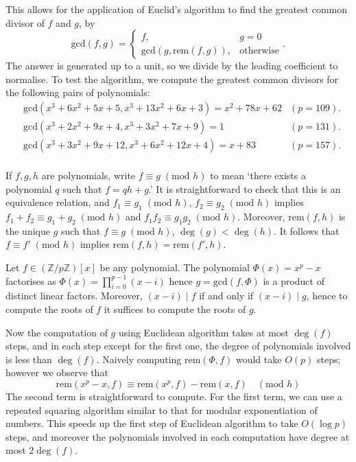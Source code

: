 \documentclass[12pt]{article}
\newcommand{\textmod}[1]{\;(\text{mod }#1)}
\newcommand{\mathmod}[1]{\quad(\text{mod }#1)}
\begin{document}
This allows for the application of Euclid's algorithm to find the greatest
common divisor of \(f\) and \(g\), by 
\[\text{gcd}(f,g) = \begin{cases} f, &g=0 \\
\text{gcd}(g,\text{rem}(f,g)),&\text{otherwise}\end{cases}.\]
The answer is generated up to a unit, so we divide by the leading coefficient to
normalise. To test the algorithm, we compute the greatest common divisors for
the following pairs of polynomials: 
\begin{align*}
    &\text{gcd}(x^3+6x^2+5x+5, x^3+13x^2+6x+3) = x^2 + 78x + 62 &(p=109). \\
    &\text{gcd}(x^3+2x^2+9x+4, x^3+3x^2+7x+9) = 1 &(p=131). \\
    &\text{gcd}(x^3+3x^2+9x+12, x^3+6x^2+12x+4) = x+83 &(p=157). \\
\end{align*}

If \(f,g,h\) are polynomials, write \(f\equiv g\textmod{h}\) to mean `there
exists a polynomial \(q\) such that \(f = qh+g\).' It is straightforward to
check that this is an equivalence relation, and \(f_1\equiv g_1\textmod{h}\),
\(f_2\equiv g_2\textmod{h}\) implies \(f_1+f_2 \equiv g_1+g_2\textmod{h}\) and
\(f_1f_2\equiv g_1g_2\textmod{h}\).  Moreover, \(\text{rem}(f,h)\) is the unique
\(g\) such that \(f\equiv g\textmod{h}\), \(\deg(g)<\deg(h)\). It follows that
\(f\equiv f'\textmod{h}\) implies \(\text{rem}(f,h)=\text{rem}(f',h)\).

Let \(f \in (\mathbb{Z}/p\mathbb{Z})[x]\) be any polynomial. The polynomial
\(\Phi(x)=x^p-x \) factorises as \(\Phi(x) = \prod_{i=0}^{p-1}(x-i)\) hence
\(g=\text{gcd}(f,\Phi)\) is a product of distinct linear factors. Moreover,
\((x-i)\;|\;f\) if and only if \((x-i)\;|\;g\), hence to compute the roots of
\(f\) it suffices to compute the roots of \(g\).

Now the computation of \(g\) using Euclidean algorithm takes at most \(\deg(f)\)
steps, and in each step except for the first one, the degree of polynomials
involved is less than \(\deg(f)\). Naively computing \(\text{rem}(\Phi, f)\)
would take \(O(p)\) steps; however we observe that
\[\text{rem}(x^p-x,f)\equiv \text{rem}(x^p,f)-\text{rem}(x,f) \mathmod{h}\]
The second term is straightforward to compute. For the first term, we can use a
repeated squaring algorithm similar to that for modular exponentiation of
numbers. This speeds up the first step of Euclidean algorithm to take \(O(\log
p)\) steps, and moreover the polynomials involved in each computation have
degree at most \(2\deg(f)\).
\end{document}
